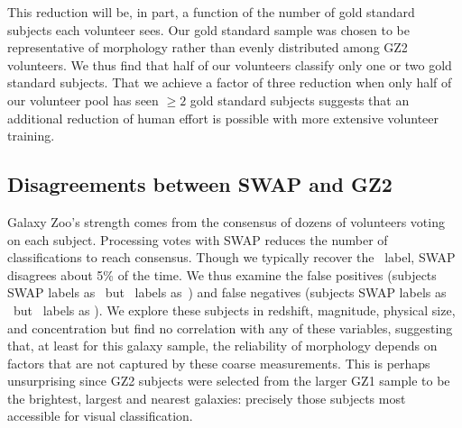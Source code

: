 This reduction will be, in part, a function of the number of gold standard subjects each volunteer sees.  Our gold standard sample was chosen to be representative of morphology rather than evenly distributed among GZ2 volunteers. We thus find that half of our volunteers classify only one or two gold standard subjects. That we achieve a factor of three reduction when only half of our volunteer pool has seen $\ge 2$ gold standard subjects suggests that an additional reduction of  human effort is possible with more extensive volunteer training.



\subsection{Disagreements between SWAP and GZ2}\label{sec: swap gz2 disagree}

Galaxy Zoo's strength comes from the consensus of dozens of volunteers voting on each subject. Processing votes with SWAP reduces the number of classifications to reach consensus. Though we typically recover the \raw~label, SWAP disagrees about 5\% of the time. We thus examine the false positives (subjects SWAP labels as \feat~but \raw~labels as~\notfeat) and false negatives (subjects SWAP labels as \notfeat~but \raw~labels as \feat). We explore these subjects in redshift, magnitude, physical size, and concentration but find no correlation with any of these variables, suggesting that, at least for this galaxy sample, the reliability of morphology depends on factors that are not captured by these coarse measurements. This is perhaps unsurprising since GZ2 subjects were selected from the larger GZ1 sample to be the brightest, largest and nearest galaxies:  precisely those subjects most accessible for visual classification. 

